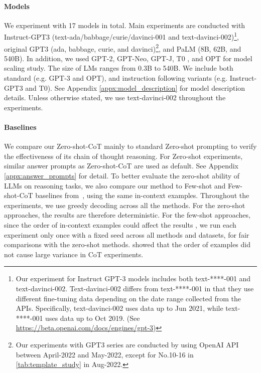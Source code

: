 \documentclass{article}
\newcommand{\CoT}{chain of thought\xspace}
\newcommand{\ours}{Zero-shot-CoT\xspace}
\newcommand{\theirs}{Few-shot-CoT\xspace}
\newcommand{\theirsz}{Zero-shot\xspace}
\newcommand{\theirsf}{Few-shot\xspace}
\begin{document}
\paragraph{Models}
We experiment with 17 models in total. Main experiments are conducted with Instruct-GPT3 \citep{instructgpt} (text-ada/babbage/curie/davinci-001 and text-davinci-002)\footnote{Our experiment for Instruct GPT-3 models includes both text-****-001 and text-davinci-002. Text-davinci-002 differs from text-****-001 in that they use different fine-tuning data depending on the date range collected from the APIs. Specifically, text-davinci-002 uses data up to Jun 2021, while text-****-001 uses data up to Oct 2019. (See \url{https://beta.openai.com/docs/engines/gpt-3})}, original GPT3 \citep{brown2020language} (ada, babbage, curie, and davinci)\footnote{Our experiments with GPT3 series are conducted by using OpenAI API between April-2022 and May-2022, except for No.10-16 in \autoref{tab:template_study} in Aug-2022.}, and PaLM \citep{palm} (8B, 62B, and 540B). 
In addition, we used GPT-2\citep{Radford2019LanguageMA}, GPT-Neo\citep{gpt-neo}, GPT-J\citep{gpt-j}, T0 \citep{sanh2022multitask}, and OPT \citep{zhang2022opt} for model scaling study. 
The size of LMs ranges from 0.3B to 540B. 
We include both standard (e.g. GPT-3 and OPT), and instruction following variants (e.g. Instruct-GPT3 and T0). 
See Appendix \ref{appx:model_description} for model description details.
Unless otherwise stated, we use text-davinci-002 throughout the experiments.

\paragraph{Baselines}
We compare our \ours mainly to standard \theirsz prompting to verify the effectiveness of its \CoT reasoning. For \theirsz experiments, similar answer prompts as \ours are used as default. See Appendix \ref{appx:answer_prompts} for detail.
To better evaluate the zero-shot ability of LLMs on reasoning tasks, we also compare our method to \theirsf and \theirs baselines from~\citep{cot_wei}, using the same in-context examples. 
Throughout the experiments, we use greedy decoding across all the methods. For the zero-shot approaches, the results are therefore deterministic. 
For the few-shot approaches, since the order of in-context examples could affect the results \citep{lu2021fantastically}, we run each experiment only once with a fixed seed across all methods and datasets, for fair comparisons with the zero-shot methods. 
\citet{cot_wei} showed that the order of examples did not cause large variance in CoT experiments. 
\end{document}
